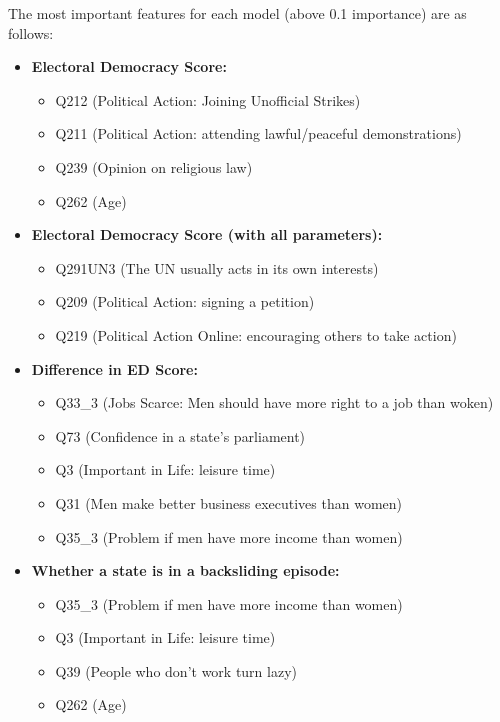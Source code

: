 \documentclass[
  letterpaper,
  DIV=11,
  numbers=noendperiod]{scrartcl}
\providecommand{\tightlist}{%
  \setlength{\itemsep}{0pt}\setlength{\parskip}{0pt}}\usepackage{longtable,booktabs,array}
\begin{document}
The most important features for each model (above 0.1 importance) are as
follows:

\begin{itemize}
\tightlist
\item
  \textbf{Electoral Democracy Score:}

  \begin{itemize}
  \tightlist
  \item
    Q212 (Political Action: Joining Unofficial Strikes)
  \item
    Q211 (Political Action: attending lawful/peaceful demonstrations)
  \item
    Q239 (Opinion on religious law)
  \item
    Q262 (Age)
  \end{itemize}
\item
  \textbf{Electoral Democracy Score (with all parameters):}

  \begin{itemize}
  \tightlist
  \item
    Q291UN3 (The UN usually acts in its own interests)
  \item
    Q209 (Political Action: signing a petition)
  \item
    Q219 (Political Action Online: encouraging others to take action)
  \end{itemize}
\item
  \textbf{Difference in ED Score:}

  \begin{itemize}
  \tightlist
  \item
    Q33\_3 (Jobs Scarce: Men should have more right to a job than woken)
  \item
    Q73 (Confidence in a state's parliament)
  \item
    Q3 (Important in Life: leisure time)
  \item
    Q31 (Men make better business executives than women)
  \item
    Q35\_3 (Problem if men have more income than women)
  \end{itemize}
\item
  \textbf{Whether a state is in a backsliding episode:}

  \begin{itemize}
  \tightlist
  \item
    Q35\_3 (Problem if men have more income than women)
  \item
    Q3 (Important in Life: leisure time)
  \item
    Q39 (People who don't work turn lazy)
  \item
    Q262 (Age)
  \end{itemize}
\end{itemize}
\end{document}

